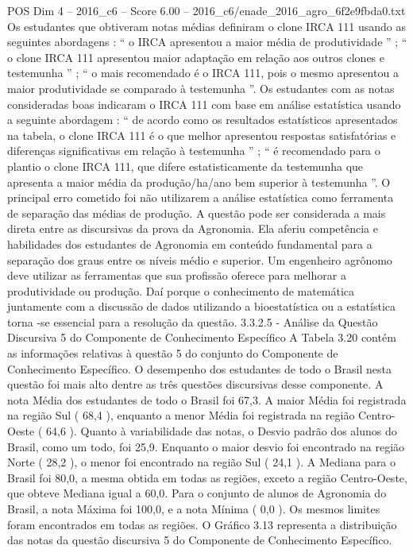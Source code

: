 \begin{textsample}{POS Dim 4 – 2016\_c6 – Score 6.00 – 2016\_c6/enade\_2016\_agro\_6f2e9fbda0.txt}
Os estudantes que obtiveram notas médias definiram o clone IRCA 111 usando as seguintes abordagens : “ o IRCA apresentou a maior média de produtividade ” ; “ o clone IRCA 111 apresentou maior adaptação em relação aos outros clones e testemunha ” ; “ o mais recomendado é o IRCA 111, pois o mesmo apresentou a maior produtividade se comparado à testemunha ”.
Os estudantes com as notas consideradas boas indicaram o IRCA 111 com base em análise estatística usando a seguinte abordagem : “ de acordo como os resultados estatísticos apresentados na tabela, o clone IRCA 111 é o que melhor apresentou respostas satisfatórias e diferenças significativas em relação à testemunha ” ; “ é recomendado para o plantio o clone IRCA 111, que difere estatisticamente da testemunha que apresenta a maior média da produção/ha/ano bem superior à testemunha ”.
O principal erro cometido foi não utilizarem a análise estatística como ferramenta de separação das médias de produção.
A questão pode ser considerada a mais direta entre as discursivas da prova da Agronomia.
Ela aferiu competência e habilidades dos estudantes de Agronomia em conteúdo fundamental para a separação dos graus entre os níveis médio e superior.
Um engenheiro agrônomo deve utilizar as ferramentas que sua profissão oferece para melhorar a produtividade ou produção.
Daí porque o conhecimento de matemática juntamente com a discussão de dados utilizando a bioestatística ou a estatística torna -se essencial para a resolução da questão. 3.3.2.5 - Análise da Questão Discursiva 5 do Componente de Conhecimento Específico A Tabela 3.20 contém as informações relativas à questão 5 do conjunto do Componente de Conhecimento Específico.
O desempenho dos estudantes de todo o Brasil nesta questão foi mais alto dentre as três questões discursivas desse componente.
A nota Média dos estudantes de todo o Brasil foi 67,3.
A maior Média foi registrada na região Sul ( 68,4 ), enquanto a menor Média foi registrada na região Centro-Oeste ( 64,6 ).
Quanto à variabilidade das notas, o Desvio padrão dos alunos do Brasil, como um todo, foi 25,9.
Enquanto o maior desvio foi encontrado na região Norte ( 28,2 ), o menor foi encontrado na região Sul ( 24,1 ).
A Mediana para o Brasil foi 80,0, a mesma obtida em todas as regiões, exceto a região Centro-Oeste, que obteve Mediana igual a 60,0.
Para o conjunto de alunos de Agronomia do Brasil, a nota Máxima foi 100,0, e a nota Mínima ( 0,0 ).
Os mesmos limites foram encontrados em todas as regiões.
O Gráfico 3.13 representa a distribuição das notas da questão discursiva 5 do Componente de Conhecimento Específico.

\end{textsample}
